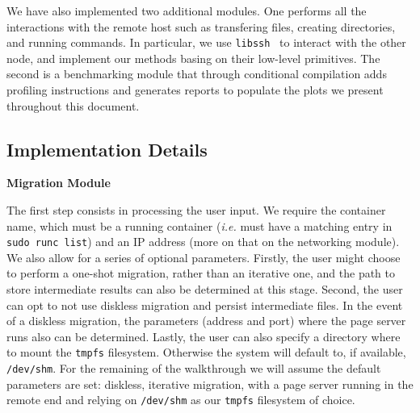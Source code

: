 We have also implemented two additional modules.
One performs all the interactions with the remote host such as transfering files, creating directories, and running \criu commands.
In particular, we use \texttt{libssh}~\cite{libssh} to interact with the other node, and implement our methods basing on their low-level primitives.
The second is a benchmarking module that through conditional compilation adds profiling instructions and generates reports to populate the plots we present throughout this document.

\subsection{Implementation Details}

\textbf{Migration Module}

The first step consists in processing the user input.
We require the container name, which must be a running container (\textit{i.e.} must have a matching entry in \texttt{sudo runc list}) and an IP address (more on that on the networking module).
We also allow for a series of optional parameters.
Firstly, the user might choose to perform a one-shot migration, rather than an iterative one, and the path to store intermediate results can also be determined at this stage.
Second, the user can opt to not use diskless migration and persist intermediate files.
In the event of a diskless migration, the parameters (address and port) where the page server runs also can be determined.
Lastly, the user can also specify a directory where to mount the \texttt{tmpfs} filesystem.
Otherwise the system will default to, if available, \texttt{/dev/shm}.
For the remaining of the walkthrough we will assume the default parameters are set: diskless, iterative migration, with a page server running in the remote end and relying on \texttt{/dev/shm} as our \texttt{tmpfs} filesystem of choice.

